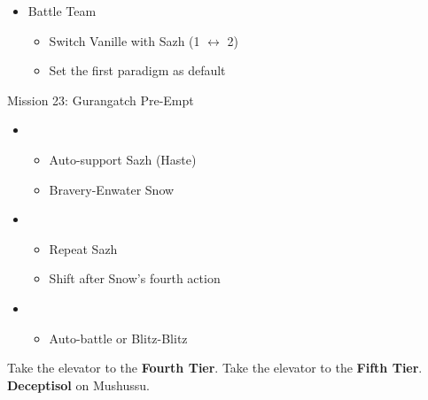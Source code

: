 \begin{multicols}{2}
  \begin{menu}
    \begin{itemize}
      \paradigm
      \begin{itemize}
        \item Battle Team
              \begin{itemize}
                \item Switch Vanille with Sazh (1 $\leftrightarrow$ 2)
                \item Set the first paradigm as default
              \end{itemize}
      \end{itemize}
    \end{itemize}
  \end{menu}
  \vfill
  \begin{battle}[0:22]{Mission 23: Gurangatch Pre-Empt}
    \begin{itemize}
      \item \first
            \begin{itemize}
              \item Auto-support Sazh (Haste)
              \item Bravery-Enwater Snow
            \end{itemize}
      \item \fifth
            \begin{itemize}
              \item Repeat Sazh
              \item Shift after Snow's fourth action
            \end{itemize}
      \item \sixth
            \begin{itemize}
              \item Auto-battle or Blitz-Blitz
            \end{itemize}
    \end{itemize}
  \end{battle}

  Take the elevator to the \textbf{Fourth Tier}.
  Take the elevator to the \textbf{Fifth Tier}.
  \textbf{Deceptisol} on Mushussu.


\end{multicols}

